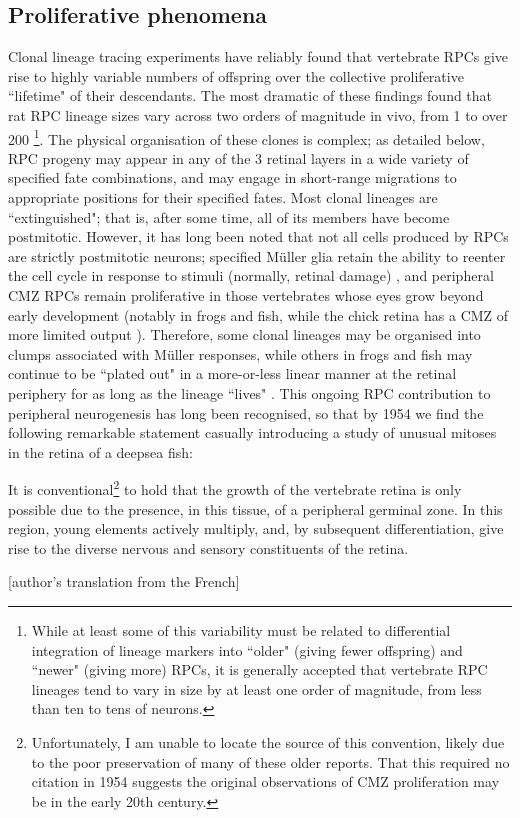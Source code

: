 \subsection{Proliferative phenomena}

Clonal lineage tracing experiments have reliably found that vertebrate RPCs give rise to highly variable numbers of offspring over the collective proliferative ``lifetime" of their descendants. The most dramatic of these findings found that rat RPC lineage sizes vary across two orders of magnitude in vivo, from 1 to over 200 \cite{Turner1990}\footnote{While at least some of this variability must be related to differential integration of lineage markers into ``older" (giving fewer offspring) and ``newer" (giving more) RPCs, it is generally accepted that vertebrate RPC lineages tend to vary in size by at least one order of magnitude, from less than ten to tens of neurons.}. The physical organisation of these clones is complex; as detailed below, RPC progeny may appear in any of the 3 retinal layers in a wide variety of specified fate combinations, and may engage in short-range migrations to appropriate positions for their specified fates. Most clonal lineages are ``extinguished"; that is, after some time, all of its members have become postmitotic. However, it has long been noted that not all cells produced by RPCs are strictly postmitotic neurons; specified M{\"u}ller glia retain the ability to reenter the cell cycle in response to stimuli (normally, retinal damage) \cite{Dyer2000,Fischer2003a}, and peripheral CMZ RPCs remain proliferative in those vertebrates whose eyes grow beyond early development (notably in frogs and fish, while the chick retina has a CMZ of more limited output \cite{Fischer2000}). Therefore, some clonal lineages may be organised into clumps associated with M{\"u}ller responses, while others in frogs and fish may continue to be ``plated out" in a more-or-less linear manner at the retinal periphery for as long as the lineage ``lives" \cite{Centanin2011}. This ongoing RPC contribution to peripheral neurogenesis has long been recognised, so that by 1954 we find the following remarkable statement casually introducing a study of unusual mitoses in the retina of a deepsea fish: 

\begin{longquote}
  It is conventional\footnote{Unfortunately, I am unable to locate the source of this convention, likely due to the poor preservation of many of these older reports. That this required no citation in 1954 suggests the original observations of CMZ proliferation may be in the early 20th century.} to hold that the growth of the vertebrate retina is only possible due to the presence, in this tissue, of a peripheral germinal zone. In this region, young elements actively multiply, and, by subsequent differentiation, give rise to the diverse nervous and sensory constituents of the retina.
  \cite{Vilter1954}
  
  [author's translation from the French]
\end{longquote}

